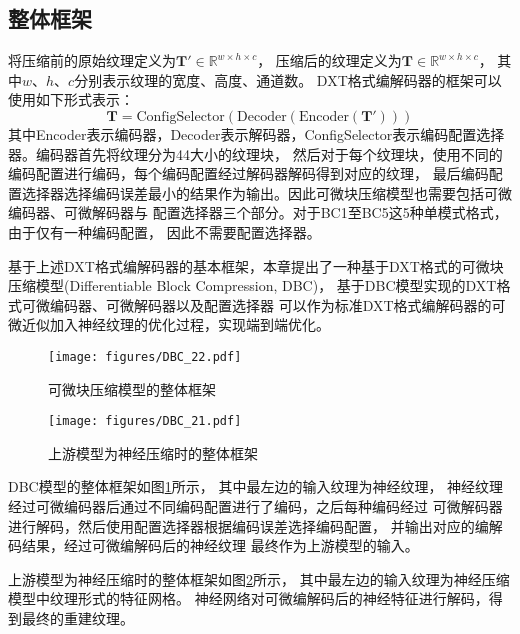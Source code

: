 \subsection{整体框架}

将压缩前的原始纹理定义为$\mathbf{T}'\in \mathbb{R}^{w\times h\times c}$，
压缩后的纹理定义为$\mathbf{T}\in \mathbb{R}^{w\times h\times c}$，
其中$w$、$h$、$c$分别表示纹理的宽度、高度、通道数。
DXT格式编解码器的框架可以使用如下形式表示：
\begin{equation}
    \mathbf{T}=\text{ConfigSelector}(\text{Decoder}(\text{Encoder}(\mathbf{T}')))
\end{equation}
其中Encoder表示编码器，Decoder表示解码器，ConfigSelector表示编码配置选择器。编码器首先将纹理分为4\times4大小的纹理块，
然后对于每个纹理块，使用不同的编码配置进行编码，每个编码配置经过解码器解码得到对应的纹理，
最后编码配置选择器选择编码误差最小的结果作为输出。因此可微块压缩模型也需要包括可微编码器、可微解码器与
配置选择器三个部分。对于BC1至BC5这5种单模式格式，由于仅有一种编码配置，
因此不需要配置选择器。

基于上述DXT格式编解码器的基本框架，本章提出了一种基于DXT格式的可微块压缩模型(Differentiable Block Compression, DBC)， 
基于DBC模型实现的DXT格式可微编码器、可微解码器以及配置选择器
可以作为标准DXT格式编解码器的可微近似加入神经纹理的优化过程，实现端到端优化。

\begin{figure}[htbp]
    \centering
    \texttt{[image: figures/DBC\_22.pdf]}
    \caption{可微块压缩模型的整体框架}
    \label{fig:DBC_overview}
\end{figure}

\begin{figure}[htbp]
    \centering
    \texttt{[image: figures/DBC\_21.pdf]}
    \caption{上游模型为神经压缩时的整体框架}
    \label{fig:DBC_nm}
\end{figure}

DBC模型的整体框架如图\ref{fig:DBC_overview}所示，
其中最左边的输入纹理为神经纹理，
神经纹理经过可微编码器后通过不同编码配置进行了编码，之后每种编码经过
可微解码器进行解码，然后使用配置选择器根据编码误差选择编码配置，
并输出对应的编解码结果，经过可微编解码后的神经纹理
最终作为上游模型的输入。

上游模型为神经压缩时的整体框架如图\ref{fig:DBC_nm}所示，
其中最左边的输入纹理为神经压缩模型中纹理形式的特征网格。
神经网络对可微编解码后的神经特征进行解码，得到最终的重建纹理。

